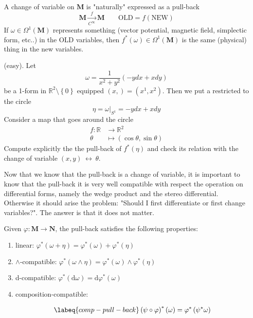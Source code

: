 \documentclass[../main.tex]{subfiles}
\begin{document}
{\selectfont{}\relax} A change of variable on $\mathbf{M}$ is "naturally" expressed as a pull-back
\[
\mathbf{M}\xrightarrow[C^\infty]{f}\mathbf{M} \qquad \textrm{OLD}=f(\textrm{NEW})
\]
If $\omega\in\Omega^1(\mathbf{M})$ represents something (vector potential, magnetic field, simplectic form, etc..) in the OLD variables, then $f^\ast(\omega)\in\Omega^1(\mathbf{M})$ is the same (physical) thing in the new variables.
\begin{example}
(easy). Let 
\[
\omega = \frac{1}{x^2+y^2}\left(-ydx+xdy\right)
\]
be a 1-form in $\mathbb{R}^2 \setminus \left\{0\right\}$ equipped $(x,)=(x^1,x^2)$. Then we put a restricted to the circle
\[
\eta=\omega\Big|_{S^1}=-ydx+xdy
\]
Consider a map that goes around the circle
\[
\begin{split}
f:\mathbb{R}& \to \mathbb{R}^2\\
\theta &\mapsto \left(\cos\theta,\sin\theta\right)
\end{split}
\]
Compute explicitly the the pull-back of $f^\ast(\eta)$ and check its relation with the change of variable $(x,y)\ \longleftrightarrow \ \theta$.
\end{example}
Now that we know that the pull-back is a change of variable, it is important to know that the pull-back it is very well compatible with respect the operation on differential forms, namely the wedge product and the stereo differential. Otherwise it should arise the problem: "Should I first differentiate or first change variables?". The answer is that it does not matter.
\begin{proposition}
Given $\varphi:\mathbf{M}\to\mathbf{N}$, the pull-back satisfies the following properties:
\begin{enumerate}
    \item linear: $\varphi^\ast\left(\omega+\eta\right)=\varphi^\ast\left(\omega\right)+\varphi^\ast(\eta)$
    \item {\color{red}$\wedge$-compatible}:
    \(
    \varphi^\ast\left(\omega\wedge\eta\right)=\varphi^\ast(\omega)\wedge\varphi^\ast(\eta)
    \)
    \item {\color{red}d-compatible}: $\varphi^\ast(\textrm{d}\omega)=\textrm{d}\varphi^\ast(\omega)$
    \item composition-compatible: 
    \begin{equation}\labeq{comp-pull-back}
        \left(\psi\circ\varphi\right)^\ast(\omega)=\varphi^\ast\left(\psi^\ast\omega\right)
    \end{equation}
\end{enumerate}
\end{proposition}
\end{document}
